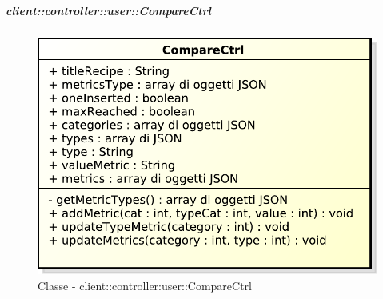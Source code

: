		\subparagraph{client::controller::user::CompareCtrl} %
		\label{subp:client_controller_user_comparectrl}
			\begin{figure}[htbp]
				\centering
				\centerline{\includegraphics[scale=0.7]{./images/client/classes/controller/compare_ctrl.pdf}}
				\caption{Classe - client::controller:user::CompareCtrl}
			\end{figure}
